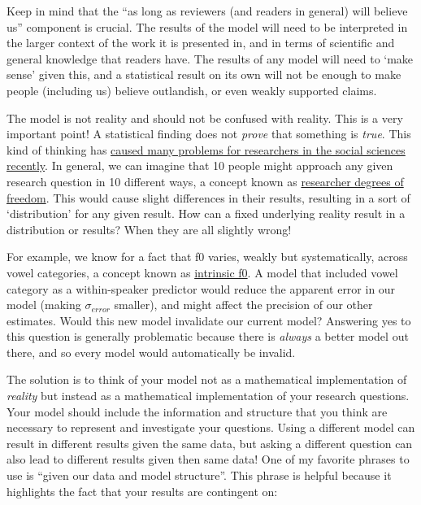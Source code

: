 \documentclass[
]{book}
\begin{document}
Keep in mind that the ``as long as reviewers (and readers in general) will believe us'' component is crucial. The results of the model will need to be interpreted in the larger context of the work it is presented in, and in terms of scientific and general knowledge that readers have. The results of any model will need to `make sense' given this, and a statistical result on its own will not be enough to make people (including us) believe outlandish, or even weakly supported claims.

The model is not reality and should not be confused with reality. This is a very important point! A statistical finding does not \emph{prove} that something is \emph{true}. This kind of thinking has \href{https://slate.com/health-and-science/2017/06/daryl-bem-proved-esp-is-real-showed-science-is-broken.html}{caused many problems for researchers in the social sciences recently}. In general, we can imagine that 10 people might approach any given research question in 10 different ways, a concept known as \href{https://en.wikipedia.org/wiki/Researcher_degrees_of_freedom}{researcher degrees of freedom}. This would cause slight differences in their results, resulting in a sort of `distribution' for any given result. How can a fixed underlying reality result in a distribution or results? When they are all slightly wrong!

For example, we know for a fact that f0 varies, weakly but systematically, across vowel categories, a concept known as \href{https://www.sciencedirect.com/science/article/abs/pii/S0095447095801650}{intrinsic f0}. A model that included vowel category as a within-speaker predictor would reduce the apparent error in our model (making \(\sigma_{error}\) smaller), and might affect the precision of our other estimates. Would this new model invalidate our current model? Answering yes to this question is generally problematic because there is \emph{always} a better model out there, and so every model would automatically be invalid.

The solution is to think of your model not as a mathematical implementation of \emph{reality} but instead as a mathematical implementation of your research questions. Your model should include the information and structure that you think are necessary to represent and investigate your questions. Using a different model can result in different results given the same data, but asking a different question can also lead to different results given then same data! One of my favorite phrases to use is ``given our data and model structure''. This phrase is helpful because it highlights the fact that your results are contingent on:
\end{document}
